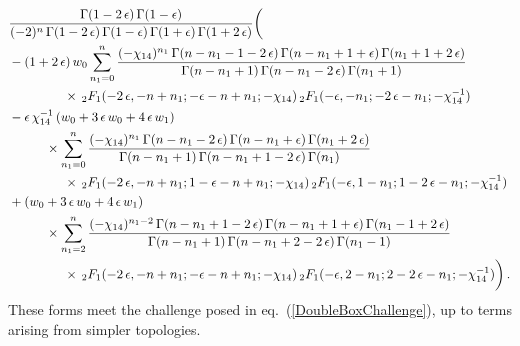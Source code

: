 \documentclass[aps,prd,preprint,groupedaddress,nofootinbib,showpacs,eqsecnum]{revtex4}
\def\eqn#1{eq.~(\ref{#1})}
\def\eps{\epsilon}
\begin{document}
\begin{equation}
\begin{aligned}
&\frac{\Gamma(1-2\,\eps)\,\Gamma(1-\eps)}
{(-2)^{n}\,
 \Gamma(1-2\,\eps)\,\Gamma(1-\eps)\,\Gamma(1+\eps)\,\Gamma(1+2\,\eps)}
\biggl(
\\&
-(1+2\,\eps)\,w_0 \sum_{n_1=0}^{n}
  \frac{(-\chi_{14})^{n_1}\,
   \Gamma(n-n_1-1-2\,\eps)\,\Gamma(n-n_1+1+\eps)\,\Gamma(n_1+1+2\,\eps)}
  {\Gamma(n-n_1+1)\,\Gamma(n-n_1-2\,\eps)\,\Gamma(n_1+1)}
\\& \hspace*{15mm} \times
  \,\F21(-2\,\eps,-n+n_1;-\eps-n+n_1;-\chi_{14})\,
  \F21(-\eps,-n_1;-2\,\eps-n_1;-\chi_{14}^{-1})
\\&
\indentN %
-\eps\,\chi_{14}^{-1}\,(w_0+3\,\eps\,w_0+4\,\eps\,w_1)
\\& \hspace*{10mm} \times
\sum_{n_1=0}^{n}
   \frac{(-\chi_{14})^{n_1}\,
         \Gamma(n-n_1-2\,\eps)\,\Gamma(n-n_1+\eps)\,\Gamma(n_1+2\,\eps)}
     {\Gamma(n-n_1+1)\,\Gamma(n-n_1+1-2\,\eps)\,\Gamma(n_1)}
\\& \hspace*{15mm} \times
    \,\F21(-2\,\eps,-n+n_1;1-\eps-n+n_1;-\chi_{14})
    \,\F21(-\eps,1-n_1;1-2\,\eps-n_1;-\chi_{14}^{-1})
\\ &
\indentN %
+(w_0+3\,\eps\,w_0+4\,\eps\,w_1)
\\& \hspace*{10mm} \times
\sum_{n_1=2}^{n}
   \frac{(-\chi_{14})^{n_1-2}\,
         \Gamma(n-n_1+1-2\,\eps)\,\Gamma(n-n_1+1+\eps)\,\Gamma(n_1-1+2\,\eps)}
        {\Gamma(n-n_1+1)\,\Gamma(n-n_1+2-2\,\eps)\,\Gamma(n_1-1)}
\\& \hspace*{15mm} \times
   \,\F21(-2\,\eps,-n+n_1;-\eps-n+n_1;-\chi_{14})
   \,\F21(-\eps,2-n_1;2-2\,\eps-n_1;-\chi_{14}^{-1})
\indentN %
\biggr)
\,.
\end{aligned}
\label{DoubleBoxGeneralTermII}
\end{equation}
These forms meet the challenge posed in \eqn{DoubleBoxChallenge}, up to terms
arising from simpler topologies.
\end{document}
